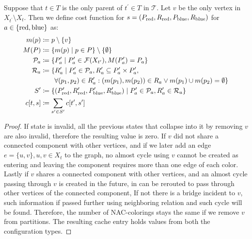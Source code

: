 Suppose that \( t \in T \) is
the only parent of \( t^\prime \in T \) in \( \mathcal {T} \).
Let \( v \) be the only vertex in \( X_{t^\prime} \setminus X_t \).
Then we define cost function for \( s=(P_{\text{red}}, R_{\text{red}}, P_{\text{blue}}, R_{\text{blue}}) \)
for \( a \in \{\text{red}, \text{blue}\} \) as:
%
\begin{align*}
	m(p)          & \coloneqq p \setminus \{v\}                                                                                                                    \\
	M(P)          & \coloneqq \{m(p) \mid p \in P \} \setminus \{\emptyset\}                                                                                       \\
	\mathcal{P}_a & \coloneqq \{ P_a^\prime \mid P_a^\prime \in \mathcal{F}(X_{t^\prime}), M(P_a^\prime) = P_a \}                                                  \\
	\mathcal{R}_a & \coloneqq \{ R_a^\prime \mid P_a^\prime \in \mathcal{P}_a, R_a^\prime \subseteq P_a^\prime \times P_a^\prime,                                  \\
	              & \qquad \forall (p_1, p_2) \in R_a^\prime : (m(p_1), m(p_2)) \in R_a \lor m(p_1) \cup m(p_2) = \emptyset \}                                     \\
	S^\prime      & \coloneqq \{(P_{\text{red}}^\prime, R_{\text{red}}^\prime, P_{\text{blue}}^\prime, R_{\text{blue}}^\prime) \mid P_a^\prime \in \mathcal{P}_a, R_a^\prime \in \mathcal{R}_a  \} \\
	c[t, s]       & \coloneqq \sum_{s^\prime \in S^\prime} c[t^\prime, s^\prime]
\end{align*}
%
%
\begin{proof}
	If state is invalid, all the previous states that collapse into it by removing \( v \)
	are also invalid, therefore the resulting value is zero.
	If \( v \) did not share a connected component with other vertices,
	and if we later add an edge \( e = \{u, v\}, u, v \in X_t \) to the graph,
	no almost cycle using \( v \) cannot be created as entering and leaving the component
	requires more than one edge of each color.
	Lastly if \( v \) shares a connected component with other vertices,
	and an almost cycle passing through \( v \) is created in the future,
	in can be rerouted to pass through other vertices of the connected component,
	If not there is a bridge incident to \( v \), such information if passed
	further using neighboring relation and such cycle will be found.
	Therefore, the number of NAC-colorings stays the same if we remove \( v \)
	from  partitions.
	The resulting cache entry holds values from both the configuration types.
\end{proof}
%

